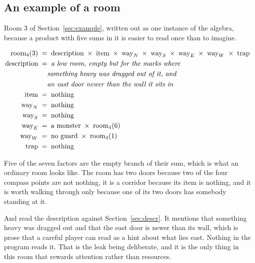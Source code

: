 \documentclass[11pt,a4paper]{article}
\begin{document}
\subsection{An example of a room}
\label{sec:exampleroom}

Room 3 of Section~\ref{sec:example}, written out as one instance of the algebra, because a product
with five sums in it is easier to read once than to imagine.

\begin{center}
\begin{tcolorbox}[plainbg, colback=pale, width=0.9\textwidth]
\begin{align*}
\text{room}_4(3) \;&=\; \text{description} \;\times\; \text{item} \;\times\;
   \text{way}_N \;\times\; \text{way}_S \;\times\; \text{way}_E \;\times\; \text{way}_W
   \;\times\; \text{trap} \\
\text{description} \;&=\; \text{\emph{a low room, empty but for the marks where}} \\
                   \;&\phantom{=\;} \text{\emph{something heavy was dragged out of it, and}} \\
                   \;&\phantom{=\;} \text{\emph{an east door newer than the wall it sits in}} \\
\text{item}   \;&=\; \text{nothing} \\
\text{way}_N  \;&=\; \text{nothing} \\
\text{way}_S  \;&=\; \text{nothing} \\
\text{way}_E  \;&=\; \text{a monster} \;\times\; \text{room}_4(6) \\
\text{way}_W  \;&=\; \text{no guard} \;\times\; \text{room}_4(1) \\
\text{trap}   \;&=\; \text{nothing}
\end{align*}
\end{tcolorbox}
\end{center}

Five of the seven factors are the empty branch of their sum, which is what an ordinary room looks
like. The room has two doors because two of the four compass points are not nothing, it is a
corridor because its item is nothing, and it is worth walking through only because one of its two
doors has somebody standing at it.

\begin{sectionbox}
And read the description against Section~\ref{sec:descr}. It mentions that something heavy was
dragged out and that the east door is newer than its wall, which is prose that a careful player can
read as a hint about what lies east. Nothing in the program reads it. That is the leak being
deliberate, and it is the only thing in this room that rewards attention rather than resources.
\end{sectionbox}
\end{document}
